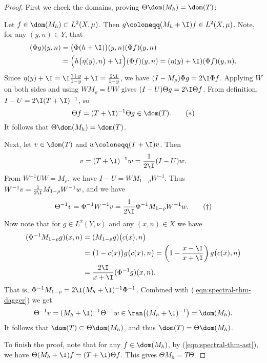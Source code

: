 \documentclass[oneside,reqno,letterpaper]{amsart}
\begin{document}
\begin{proof}
  \noindent
  First we check the domains, proving \(\Theta \dom(M_{h}) = \dom(T)\):
  
  Let \(f \in \dom(M_{h}) \subset L^2(X, \mu)\). 
  Then \(g \coloneqq (M_{h} + \I) f \in L^2(X, \mu)\). 
  Note, for any \((y, n) \in Y\), that 
  \begin{align*}
    (\Phi g) (y, n) 
    &= \big(\Phi (h + \I) \big)(y, n) (\Phi f)(y, n) \\ 
    &= \Big( h\big(\eta(y), n\big) + \I \Big) (\Phi f)(y, n) = (\eta(y) + \I) (\Phi f) (y, n) . 
  \end{align*}
  Since \(\eta(y) + \I = \I \frac{1 + y}{1 - y} + \I = \frac{2 \I}{1 - y}\), we have \((I - M_{\rho}) \Phi g = 2\I \Phi f\). 
  Applying \(W\) on both sides and using  \(WM_{\rho} = UW\) gives \((I - U) \Theta g = 2 \I \Theta f\). 
  From definition, \(I - U = 2 \I (T + \I)^{-1}\), so 
  \begin{equation}
  \label{eqn:spectral-thm-ast}
    \Theta f = (T + \I)^{-1} \Theta g \in \dom(T) . 
    \tag{\(\ast\)}
  \end{equation}
  It follows that \(\Theta \dom(M_{h}) = \dom(T)\). 

  Next, let \(v \in \dom(T)\) and \(w \coloneqq (T + \I) v\). Then \[
    v = (T + \I)^{-1} w = \frac{1}{2 \I} (I - U) w . 
  \] 
  From \(W^{-1} U W = M_{\rho}\), we have \(I - U = W M_{1 - \rho} W^{-1}\).
  Thus \(W^{-1} v = \frac{1}{2 \I} M_{1 - \rho} W^{-1} w\), and we have 
  \begin{equation}
  \label{eqn:spectral-thm-dagger}
    \Theta^{-1} v = \Phi^{-1} W^{-1} v = \frac{1}{2 \I} \Phi^{-1} M_{1 - \rho} W^{-1} w . 
    \tag{\(\dagger\)}
  \end{equation}
  Now note that for \(g \in L^2(Y, \nu)\) and any \((x, n) \in X\) we have
  \begin{align*}
    (\Phi^{-1} M_{1 - \rho} g)(x, n) 
    &= (M_{1 - \rho} g) \big(c(x), n\big) \\
    &= \big(1 - c(x)\big) g\big( c(x), n \big) 
      = \left( 1 - \frac{x - \I}{x + \I} \right) g\big( c(x), n \big) \\ 
    &= \frac{2\I}{x + \I} (\Phi^{-1} g) (x, n) . 
  \end{align*}
  That is, \(\Phi^{-1} M_{1 - \rho} = 2 \I (M_{h} + \I)^{-1} \Phi^{-1}\). Combined with (\ref{eqn:spectral-thm-dagger}) we get 
  \[
    \Theta^{-1} v = (M_{h} + \I)^{-1} \Theta^{-1} w \in \ran\big((M_{h} + \I)^{-1}\big) = \dom(M_{h}) . 
  \] 
  It follows that \(\dom(T) \subset \Theta \dom(M_{h})\), and thus \(\dom(T) = \Theta \dom(M_{h})\). 

  To finish the proof, note that for any \(f \in \dom(M_{h})\), by (\ref{eqn:spectral-thm-ast}), we have \(\Theta (M_{h} + \I) f = (T + \I) \Theta f\).
  This gives \(\Theta M_{h} = T \Theta\). 
\end{proof}
\end{document}
